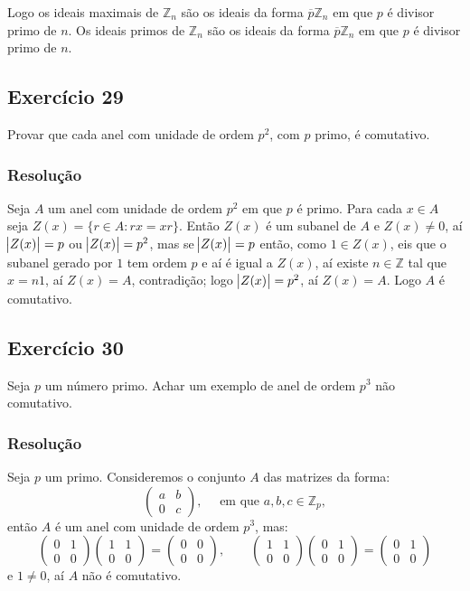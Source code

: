 \documentclass[10pt,a4paper]{article}
\begin{document}
\medskip
\noindent
Logo os ideais maximais de $\mathbb{Z}_n$ são os ideais da forma $\overline{p}\mathbb{Z}_n$ em que $p$ é divisor primo de $n$. Os ideais primos de $\mathbb{Z}_n$ são os ideais da forma $\overline{p}\mathbb{Z}_n$ em que $p$ é divisor primo de $n$.

\subsection*{Exercício 29}
Provar que cada anel com unidade de ordem $p^2$, com $p$ primo, é comutativo.

\subsubsection*{Resolução}

Seja $A$ um anel com unidade de ordem $p^2$ em que $p$ é primo. Para cada $x\in A$ seja $Z(x)=\{r\in A:rx=xr\}$. Então $Z(x)$ é um subanel de $A$ e $Z(x)\neq 0$, aí $\abs{Z(x)}=p$ ou $\abs{Z(x)}=p^2$, mas se $\abs{Z(x)}=p$ então, como $1\in Z(x)$, eis que o subanel gerado por $1$ tem ordem $p$ e aí é igual a $Z(x)$, aí existe $n\in\mathbb{Z}$ tal que $x=n1$, aí $Z(x)=A$, contradição; logo $\abs{Z(x)}=p^2$, aí $Z(x)=A$. Logo $A$ é comutativo.

\subsection*{Exercício 30}
Seja $p$ um número primo. Achar um exemplo de anel de ordem $p^3$ não comutativo.

\subsubsection*{Resolução}

Seja $p$ um primo. Consideremos o conjunto $A$ das matrizes da forma:
\[
\begin{pmatrix}
a&b\\0&c
\end{pmatrix},\quad\text{ em que }a,b,c\in\mathbb{Z}_p,
\]
então $A$ é um anel com unidade de ordem $p^3$, mas:
\[
\begin{pmatrix}
0&1\\0&0
\end{pmatrix}
\begin{pmatrix}
1&1\\0&0
\end{pmatrix}=
\begin{pmatrix}
0&0\\0&0
\end{pmatrix},\quad\quad
\begin{pmatrix}
1&1\\0&0
\end{pmatrix}
\begin{pmatrix}
0&1\\0&0
\end{pmatrix}=
\begin{pmatrix}
0&1\\0&0
\end{pmatrix}
\]
e $1\neq 0$, aí $A$ não é comutativo.
\end{document}
